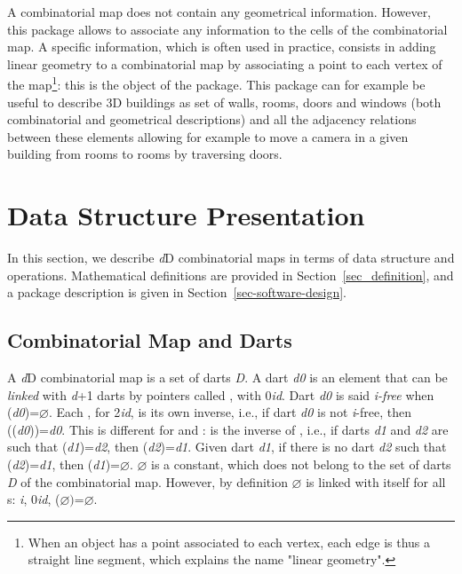 A combinatorial map does not contain any geometrical
information. However, this package allows to associate any information
to the cells of the combinatorial map. A specific information, which
is often used in practice, consists in adding linear geometry to a
combinatorial map by associating a point to each vertex of the
map\footnote{When an object has a point associated to each vertex,
  each edge is thus a straight line segment, which explains the name
  "linear geometry".}: this is the object of the
 package. This package can for example be
useful to describe 3D buildings as set of walls, rooms, doors and
windows (both combinatorial and geometrical descriptions) and all the
adjacency relations between these elements allowing for example to
move a camera in a given building from rooms to rooms by traversing
doors.

\section{Data Structure Presentation}\label{sec_presentation}

In this section, we describe \emph{d}D combinatorial maps in terms of data
structure and operations. Mathematical definitions are provided in
Section~\ref{sec_definition}, and a package description is given in
Section~\ref{sec-software-design}.

\subsection{Combinatorial Map and Darts}\label{ssec-combi-map-and-darts}

A \emph{d}D combinatorial map is a set of darts \emph{D}. A dart \emph{d0} is an
element that can be \emph{linked} with \emph{d}+1 darts by pointers called
\betai{}, with 0\myleq{}\emph{i}\myleq{}\emph{d}.  Dart \emph{d0} is said \emph{i-free}
when \betai{}(\emph{d0})=$\varnothing$.  Each \betai{}, for 2\myleq{}\emph{i}\myleq{}\emph{d},
is its own inverse, i.e., if dart \emph{d0} is not \emph{i}-free, then
\betai{}(\betai{}(\emph{d0}))=\emph{d0}.  This is different for \betazero{} and
\betaun{}: \betazero{} is the inverse of \betaun{}, i.e., if darts \emph{d1}
and \emph{d2} are such that \betaun{}(\emph{d1})=\emph{d2}, then
\betazero{}(\emph{d2})=\emph{d1}. Given dart \emph{d1}, if there is no dart \emph{d2} such
that \betaun{}(\emph{d2})=\emph{d1}, then \betazero{}(\emph{d1})=$\varnothing$.  $\varnothing$
is a constant, which does not belong to the set of darts \emph{D} of the
combinatorial map. However, by definition $\varnothing$ is linked with
itself for all \betai{}s: \myforall{}\emph{i}, 0\myleq{}\emph{i}\myleq{}\emph{d},
\betai{}($\varnothing)$=$\varnothing$.

